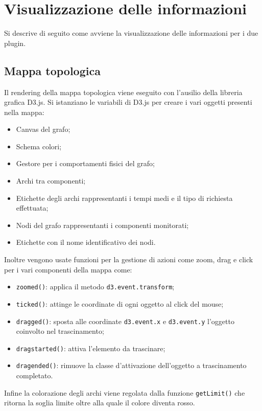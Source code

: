 \section{Visualizzazione delle informazioni}
\label{sec:visInfo}
Si descrive di seguito come avviene la visualizzazione delle informazioni per i due plugin. 
\subsection{Mappa topologica}
Il rendering della mappa topologica viene eseguito con l'ausilio della libreria grafica D3.js. Si istanziano le variabili di D3.js per creare i vari oggetti presenti nella mappa:
\begin{itemize}
	\item Canvas del grafo;
	\item Schema colori;
	\item Gestore per i comportamenti fisici del grafo;
	\item Archi tra componenti;
	\item Etichette degli archi rappresentanti i tempi medi e il tipo di richiesta effettuata;
	\item Nodi del grafo rappresentanti i componenti monitorati;
	\item Etichette con il nome identificativo dei nodi.
\end{itemize}
Inoltre vengono usate funzioni per la gestione di azioni come zoom, drag e click per i vari componenti della mappa come:
\begin{itemize}
	\item \texttt{zoomed()}: applica il metodo \texttt{d3.event.transform};
	\item \texttt{ticked()}: attinge le coordinate di ogni oggetto al click del mouse;
	\item \texttt{dragged()}: sposta alle coordinate \texttt{d3.event.x} e \texttt{d3.event.y} l'oggetto coinvolto nel trascinamento;
	\item \texttt{dragstarted()}: attiva l'elemento da trascinare;
	\item \texttt{dragended()}: rimuove la classe d'attivazione dell'oggetto a trascinamento completato.
\end{itemize}

Infine la colorazione degli archi viene regolata dalla funzione \texttt{getLimit()} che ritorna la soglia limite oltre alla quale il colore diventa rosso. 


